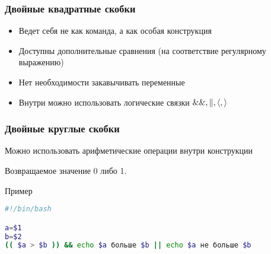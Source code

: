 \begin{frame}[fragile]
	\frametitle{Двойные квадратные скобки}

	\begin{itemize}
		\item Ведет себя не как команда, а как особая конструкция
		\item Доступны дополнительные сравнения (на соответствие регулярному выражению)
		\item Нет необходимости закавычивать переменные
		\item Внутри можно использовать логические связки \({\tt \&\&, \|, \langle, \rangle}\)
	\end{itemize}
\end{frame}

\begin{frame}[fragile]
	\frametitle{Двойные круглые скобки}

	Можно использовать арифметические операции внутри конструкции\\

	Возвращаемое значение 0 либо 1.

	\begin{block}{Пример}
		\begin{lstlisting}[language=bash]
#!/bin/bash

a=$1
b=$2
(( $a > $b )) && echo $a больше $b || echo $a не больше $b
		\end{lstlisting}
	\end{block}
\end{frame}


